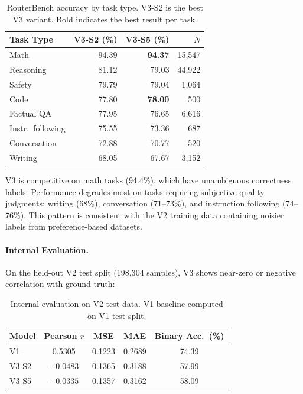 \begin{table}[h]
\centering
\caption{RouterBench accuracy by task type. V3-S2 is the best V3 variant. Bold indicates the best result per task.}
\label{tab:v3_task}
\small
\begin{tabular}{lrrr}
\toprule
\textbf{Task Type} & \textbf{V3-S2 (\%)} & \textbf{V3-S5 (\%)} & \textbf{$N$} \\
\midrule
Math & 94.39 & \textbf{94.37} & 15{,}547 \\
Reasoning & 81.12 & 79.03 & 44{,}922 \\
Safety & 79.79 & 79.04 & 1{,}064 \\
Code & 77.80 & \textbf{78.00} & 500 \\
Factual QA & 77.95 & 76.65 & 6{,}616 \\
Instr.\ following & 75.55 & 73.36 & 687 \\
Conversation & 72.88 & 70.77 & 520 \\
Writing & 68.05 & 67.67 & 3{,}152 \\
\bottomrule
\end{tabular}
\end{table}

V3 is competitive on math tasks (94.4\%), which have unambiguous correctness labels. Performance degrades most on tasks requiring subjective quality judgments: writing (68\%), conversation (71--73\%), and instruction following (74--76\%). This pattern is consistent with the V2 training data containing noisier labels from preference-based datasets.

\paragraph{Internal Evaluation.}

On the held-out V2 test split (198,304 samples), V3 shows near-zero or negative correlation with ground truth:

\begin{table}[h]
\centering
\caption{Internal evaluation on V2 test data. V1 baseline computed on V1 test split.}
\label{tab:v3_internal}
\small
\begin{tabular}{lcccc}
\toprule
\textbf{Model} & \textbf{Pearson $r$} & \textbf{MSE} & \textbf{MAE} & \textbf{Binary Acc.\ (\%)} \\
\midrule
V1 & 0.5305 & 0.1223 & 0.2689 & 74.39 \\
V3-S2 & $-0.0483$ & 0.1365 & 0.3188 & 57.99 \\
V3-S5 & $-0.0335$ & 0.1357 & 0.3162 & 58.09 \\
\bottomrule
\end{tabular}
\end{table}

